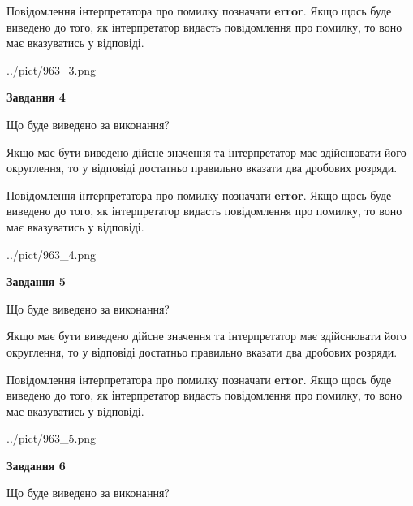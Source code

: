 \documentclass[12pt, ukrainian]{article}
\begin{document}
{\begin {Large}
Повідомлення інтерпретатора про помилку позначати \textbf{error}.
Якщо щось буде виведено до того, як інтерпретатор видасть повідомлення про помилку, 
то воно має вказуватись у відповіді. \par

\begin{center}
	{../pict/963_3.png}
\end{center}
\newpage

{\begin {center}\textbf{Завдання 4}\end {center}}\par
Що буде виведено за виконання? \par

Якщо має бути виведено дійсне значення та інтерпретатор має здійснювати його округлення, 
то у відповіді достатньо правильно вказати два дробових розряди.

Повідомлення інтерпретатора про помилку позначати \textbf{error}.
Якщо щось буде виведено до того, як інтерпретатор видасть повідомлення про помилку, 
то воно має вказуватись у відповіді. \par

\begin{center}
	{../pict/963_4.png}
\end{center}
\newpage

{\begin {center}\textbf{Завдання 5}\end {center}}\par
Що буде виведено за виконання? \par

Якщо має бути виведено дійсне значення та інтерпретатор має здійснювати його округлення, 
то у відповіді достатньо правильно вказати два дробових розряди.

Повідомлення інтерпретатора про помилку позначати \textbf{error}.
Якщо щось буде виведено до того, як інтерпретатор видасть повідомлення про помилку, 
то воно має вказуватись у відповіді. \par

\begin{center}
	{../pict/963_5.png}
\end{center}
\newpage

{\begin {center}\textbf{Завдання 6}\end {center}}\par
Що буде виведено за виконання? \par


\end{Large}}
\end{document}
